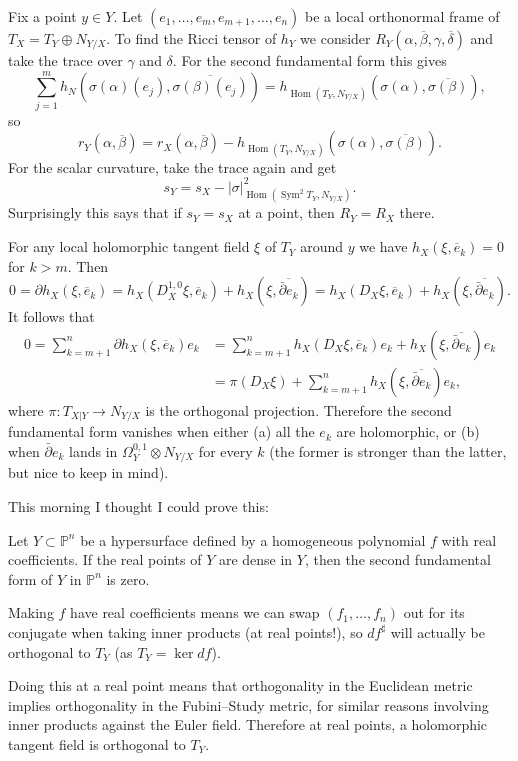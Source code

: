 \documentclass[11pt]{article}
\theoremstyle{definition}
\newcommand{\kk}[1]{\mathbb{#1}}
\def\ov#1{\overline{#1}}
\DeclareMathOperator{\Hom}{Hom}
\begin{document}
Fix a point $y \in Y$.
Let $(e_1,\ldots,e_m,e_{m+1},\ldots,e_n)$ be a local orthonormal frame of $T_X =
T_Y \oplus N_{Y/X}$.
To find the Ricci tensor of $h_Y$ we consider $R_Y(\alpha, \ov\beta, \gamma,
\ov\delta)$ and take the trace over $\gamma$ and $\delta$. For the second
fundamental form this gives
$$
\sum_{j=1}^m h_N(\sigma(\alpha)(e_j), \ov{\sigma(\beta)(e_j)})
= h_{\Hom(T_Y, N_{Y/X})}(\sigma(\alpha), \ov{\sigma(\beta)}),
$$
so
$$
r_Y(\alpha, \ov\beta)
= r_X(\alpha, \ov\beta)
- h_{\Hom(T_Y, N_{Y/X})}(\sigma(\alpha), \ov{\sigma(\beta)}).
$$
For the scalar curvature, take the trace again and get
$$
s_Y = s_X - |\sigma|^2_{\Hom(\operatorname{Sym}^2 T_Y, N_{Y/X})}.
$$
Surprisingly this says that if $s_Y = s_X$ at a point, then $R_Y = R_X$ there.


For any local holomorphic tangent field $\xi$ of $T_Y$ around $y$ we have
$h_X(\xi, \ov e_k) = 0$ for $k > m$. Then
$$
0 = \partial h_X(\xi, \ov e_k)
= h_X(D_X^{1,0} \xi, \ov e_k) + h_X(\xi, \ov{\bar\partial e_k})
= h_X(D_X \xi, \ov e_k) + h_X(\xi, \ov{\bar\partial e_k}).
$$
It follows that
\begin{align*}
0
= \!\!\! \sum_{k=m+1}^n \!\!\! \partial h_X(\xi, \ov e_k) e_k
&= \!\!\! \sum_{k=m+1}^n \!\!\! h_X(D_X \xi, \ov e_k)e_k + h_X(\xi, \ov{\bar\partial e_k}) e_k
\\
&= \pi(D_X \xi) + \!\!\! \sum_{k=m+1}^n \!\!\! h_X(\xi, \ov{\bar\partial e_k}) e_k,
\end{align*}
where $\pi : T_{X|Y} \to N_{Y/X}$ is the orthogonal projection.
Therefore the second fundamental form vanishes when either (a) all the $e_k$ are
holomorphic, or (b) when $\bar\partial e_k$ lands in $\Omega_Y^{0,1} \otimes
N_{Y/X}$ for every $k$ (the former is stronger than the latter, but nice to keep
in mind).


This morning I thought I could prove this:

Let $Y \subset \kk P^n$ be a hypersurface defined by a homogeneous polynomial
$f$ with real coefficients.
If the real points of $Y$ are dense in $Y$, then the second fundamental form of
$Y$ in $\kk P^n$ is zero.

Making $f$ have real coefficients means we can swap $(f_1,\ldots,f_n)$ out for
its conjugate when taking inner products (at real points!), so $df^\sharp$ will
actually be orthogonal to $T_Y$ (as $T_Y = \ker df$).

Doing this at a real point means that orthogonality in the Euclidean metric
implies orthogonality in the Fubini--Study metric, for similar reasons involving
inner products against the Euler field.
Therefore at real points, a holomorphic tangent field is orthogonal to $T_Y$.
\end{document}
